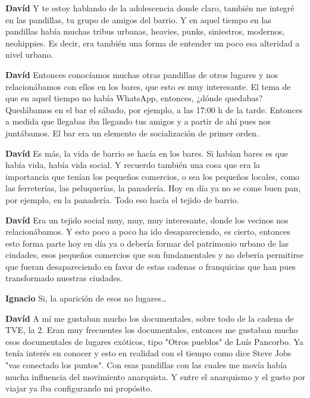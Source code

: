 \documentclass[
  spanish,
  11pt,
  a4paper,
]{scrbook}
\newenvironment{transcripcion}{
    \begin{list}{}{
        \setlength{\leftmargin}{1.5em}  %
        \setlength{\rightmargin}{0em}
        \setlength{\itemsep}{0.2em}     %
        \setlength{\parsep}{0.0em}
        \setlength{\listparindent}{0pt}
    }
}{
    \end{list}
}
\newcommand{\personaje}[1]{\textbf{#1}\quad}
\begin{document}
\begin{transcripcion}
\item \personaje{Davíd} Y te estoy hablando de la adolescencia donde claro, también me integré en las pandillas, tu grupo de amigos del barrio. Y en aquel tiempo en las pandillas había muchas tribus urbanas, heavies, punks, siniestros, modernos, neohippies. Es decir, era también una forma de entender un poco esa alteridad a nivel urbano.

\item \personaje{Davíd} Entonces conocíamos muchas otras pandillas de otros lugares y nos relacionábamos con ellos en los bares, que esto es muy interesante. El tema de que en aquel tiempo no había WhatsApp, entonces, ¿dónde quedabas? Quedábamos en el bar el sábado, por ejemplo, a las 17:00 h de la tarde. Entonces a medida que llegabas iba llegando tus amigos y a partir de ahí pues nos juntábamos. El bar era un elemento de socialización de primer orden.

\item \personaje{Davíd} Es más, la vida de barrio se hacía en los bares. Si habían bares es que había vida, había vida social. Y recuerdo también una cosa que era la importancia que tenían los pequeños comercios, o sea los pequeños locales, como las ferreterías, las peluquerías, la panadería. Hoy en día ya no se come buen pan, por ejemplo, en la panadería. Todo eso hacía el tejido de barrio.

\item \personaje{Davíd} Era un tejido social muy, muy, muy interesante, donde los vecinos nos relacionábamos. Y esto poco a poco ha ido desapareciendo, es cierto, entonces esto forma parte hoy en día ya o debería formar del patrimonio urbano de las ciudades, esos pequeños comercios que son fundamentales y no debería permitirse que fueran desapareciendo en favor de estas cadenas o franquicias que han pues transformado nuestras ciudades.

\item \personaje{Ignacio} Si, la aparición de esos no lugares…

\item \personaje{Davíd} A mí me gustaban mucho los documentales, sobre todo de la cadena de TVE, la 2. Eran muy frecuentes los documentales, entonces me gustaban mucho esos documentales de lugares exóticos, tipo "Otros pueblos" de Luís Pancorbo. Ya tenía interés en conocer y esto en realidad con el tiempo como dice Steve Jobs "vas conectado los puntos". Con esas pandillas con las cuales me movía había mucha influencia del movimiento anarquista. Y entre el anarquismo y el gusto por viajar ya iba configurando mi propósito.


\end{transcripcion}
\end{document}

